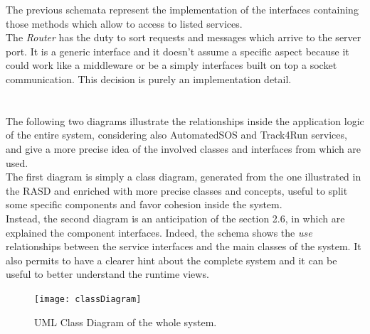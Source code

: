 \documentclass[a4paper]{article}
\begin{document}
\vspace{.5cm}
\noindent The previous schemata represent the implementation of the interfaces containing those methods which allow to access to listed services. \\ 
The \textit{Router} has the duty to sort requests and messages which arrive to the server port. It is a generic interface and it doesn't assume a specific aspect because it could work like a middleware or be a simply interfaces built on top a socket communication. This decision is purely an implementation detail.\\ \\ \\
The following two diagrams illustrate the relationships inside the application logic of the entire system, considering also AutomatedSOS and Track4Run services, and give a more precise idea of the involved classes and interfaces from which are used.\\
The first diagram is simply a class diagram, generated from the one illustrated in the RASD and enriched with more precise classes and concepts, useful to split some specific components and favor cohesion inside the system.\\
Instead, the second diagram is an anticipation of the section 2.6, in which are explained the component interfaces. Indeed, the schema shows the \textit{use} relationships between the service interfaces and the main classes of the system. It also permits to have a clearer hint about the complete system and it can be useful to better understand the runtime views.  

\begin{figure}
    \centering
    \texttt{[image: classDiagram]}
    \caption{UML Class Diagram of the whole system.}
    \label{fig:my_label}
\end{figure}
\end{document}

